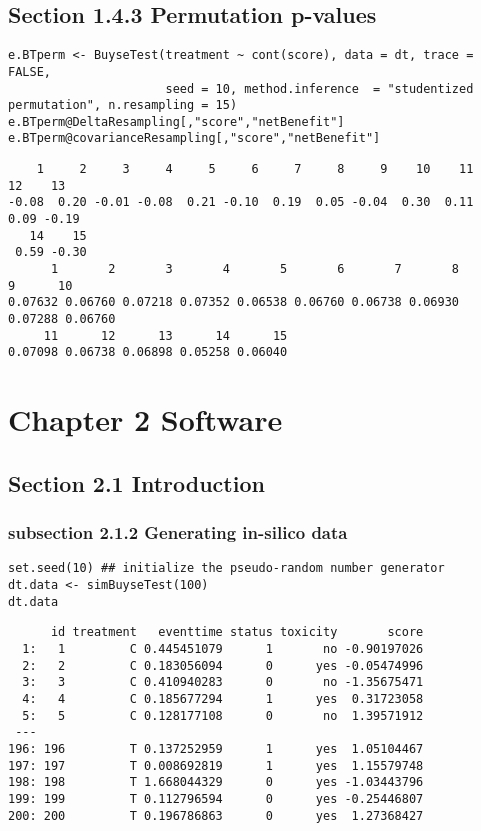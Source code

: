 \documentclass[12pt]{article}
\begin{document}
\subsection{Section 1.4.3 Permutation p-values}
\label{sec:org36616b0}
\lstset{language=r,label= ,caption= ,captionpos=b,numbers=none}
\begin{lstlisting}
e.BTperm <- BuyseTest(treatment ~ cont(score), data = dt, trace = FALSE,
                      seed = 10, method.inference  = "studentized permutation", n.resampling = 15)
e.BTperm@DeltaResampling[,"score","netBenefit"]
e.BTperm@covarianceResampling[,"score","netBenefit"]
\end{lstlisting}

\begin{verbatim}
    1     2     3     4     5     6     7     8     9    10    11    12    13 
-0.08  0.20 -0.01 -0.08  0.21 -0.10  0.19  0.05 -0.04  0.30  0.11  0.09 -0.19 
   14    15 
 0.59 -0.30
      1       2       3       4       5       6       7       8       9      10 
0.07632 0.06760 0.07218 0.07352 0.06538 0.06760 0.06738 0.06930 0.07288 0.06760 
     11      12      13      14      15 
0.07098 0.06738 0.06898 0.05258 0.06040
\end{verbatim}

\section{Chapter 2 Software}
\label{sec:orgbfddf21}
\subsection{Section 2.1 Introduction}
\label{sec:orgfae340e}
\subsubsection{subsection 2.1.2 Generating in-silico data}
\label{sec:org78fcb3e}
\lstset{language=r,label= ,caption= ,captionpos=b,numbers=none}
\begin{lstlisting}
set.seed(10) ## initialize the pseudo-random number generator 
dt.data <- simBuyseTest(100)
dt.data
\end{lstlisting}

\begin{verbatim}
      id treatment   eventtime status toxicity       score
  1:   1         C 0.445451079      1       no -0.90197026
  2:   2         C 0.183056094      0      yes -0.05474996
  3:   3         C 0.410940283      0       no -1.35675471
  4:   4         C 0.185677294      1      yes  0.31723058
  5:   5         C 0.128177108      0       no  1.39571912
 ---                                                      
196: 196         T 0.137252959      1      yes  1.05104467
197: 197         T 0.008692819      1      yes  1.15579748
198: 198         T 1.668044329      0      yes -1.03443796
199: 199         T 0.112796594      0      yes -0.25446807
200: 200         T 0.196786863      0      yes  1.27368427
\end{verbatim}
\end{document}
